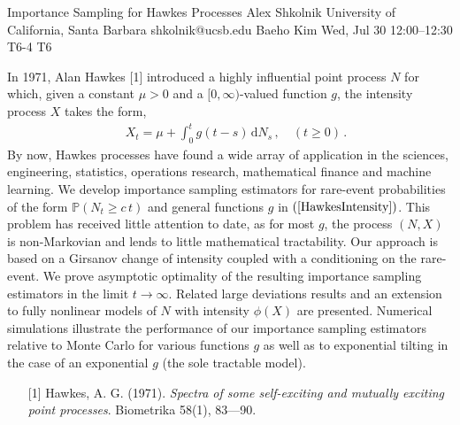 \begin{talk}
  {Importance Sampling for Hawkes Processes}%
  {Alex Shkolnik}%
  {University of California, Santa Barbara}%
  {shkolnik@ucsb.edu}%
  {Baeho Kim}%
  {}%
  {Wed, Jul 30 12:00–12:30}%
  {T6-4}%
  {T6}%
  
				
			
In 1971, Alan Hawkes [1] introduced a highly influential point
process $N$ for which, given a constant $\mu > 0$ and a
$[0,\infty)$-valued function $g$, the intensity process $X$
takes the form,
\begin{align} \label{HawkesIntensity} 
 \quad X_t = \mu + \int_0^t g(t-s) \, \mathrm{d} N_s \, ,
 \quad (t \ge 0) \, .
\end{align}
By now, Hawkes processes have found a wide array of application
in the sciences, engineering, statistics, operations research,
mathematical finance and machine learning. We develop importance
sampling estimators for rare-event probabilities of the form
$\mathbb{P}(N_t \ge c \, t)$ and general functions $g$ in
$(\ref{HawkesIntensity})$. This problem has received little 
attention to
date, as for most $g$, the process $(N,X)$ is
non-Markovian and lends to little mathematical tractability.
Our approach is based on a Girsanov change of intensity coupled
with a conditioning on the rare-event.  We prove asymptotic
optimality of the resulting importance sampling estimators in
the limit $t \to \infty$. Related large deviations results and
an extension to fully nonlinear models of $N$ with intensity
$\phi(X)$ are presented.  Numerical simulations illustrate the
performance of our importance sampling estimators relative to
Monte Carlo for various functions $g$ as well as to exponential
tilting in the case of an exponential $g$ (the sole tractable
model).


\medskip


\begin{enumerate}
	\item[{[1]}] Hawkes, A. G. (1971). {\it Spectra of some 
self-exciting and mutually exciting point processes}. 
Biometrika 58(1), 83---90.
\end{enumerate}


\end{talk}

